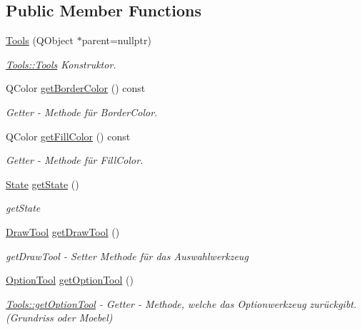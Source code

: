 \subsection*{Public Member Functions}
\begin{DoxyCompactItemize}
\item 
\hyperlink{class_tools_a33adedcb5a43ffd5a1b62515b4a3db2c}{Tools} (Q\+Object $\ast$parent=nullptr)
\begin{DoxyCompactList}\small\item\em \hyperlink{class_tools_a33adedcb5a43ffd5a1b62515b4a3db2c}{Tools\+::\+Tools} Konstruktor. \end{DoxyCompactList}\item 
Q\+Color \hyperlink{class_tools_a263df3826bfd5975d1e379060ea554dc}{get\+Border\+Color} () const
\begin{DoxyCompactList}\small\item\em Getter -\/ Methode für Border\+Color. \end{DoxyCompactList}\item 
Q\+Color \hyperlink{class_tools_acb1e17bcb34c9290423b55a7f92d9936}{get\+Fill\+Color} () const
\begin{DoxyCompactList}\small\item\em Getter -\/ Methode für Fill\+Color. \end{DoxyCompactList}\item 
\hyperlink{class_tools_a2847c269682818722541d9002fdf0824}{State} \hyperlink{class_tools_ae81ec47ff47279c8a8f319d822c3bb9f}{get\+State} ()
\begin{DoxyCompactList}\small\item\em get\+State \end{DoxyCompactList}\item 
\hyperlink{class_tools_ab031688a77e89a80ce8b5db7014684a3}{Draw\+Tool} \hyperlink{class_tools_a4e8bdc1c74c1d9b5969c6b8afef0f805}{get\+Draw\+Tool} ()
\begin{DoxyCompactList}\small\item\em get\+Draw\+Tool -\/ Setter Methode für das Auswahlwerkzeug \end{DoxyCompactList}\item 
\hyperlink{class_tools_a4b55b2ca4eef4d80ae1042233832bb8b}{Option\+Tool} \hyperlink{class_tools_a45d1e69e6f93c92df35756f3b48092ca}{get\+Option\+Tool} ()
\begin{DoxyCompactList}\small\item\em \hyperlink{class_tools_a45d1e69e6f93c92df35756f3b48092ca}{Tools\+::get\+Option\+Tool} -\/ Getter -\/ Methode, welche das Optionwerkzeug zurückgibt. (Grundriss oder Moebel) \end{DoxyCompactList}\end{DoxyCompactItemize}
